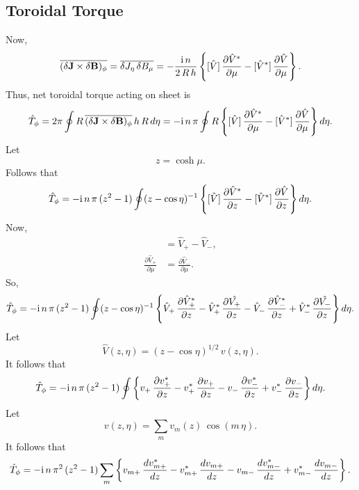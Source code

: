 \documentclass[12pt,prb,aps,notitlepage]{revtex4-1}
\begin{document}
\subsection{Toroidal Torque}
Now,
\begin{equation}
\overline{(\delta {\bf J}\times \delta{\bf B})_\phi} = \overline {\delta J_\eta\,\delta B_\mu}
=-\frac{{\rm i}\,n}{2\,R\,h}\left\{[\hat{V}]\,\frac{\partial\hat{V}^\ast}{\partial\mu} - [\hat{V}^\ast]\,\frac{\partial\hat{V}}{\partial\mu}\right\}.
\end{equation}
Thus, net toroidal torque acting on sheet is
\begin{equation}
\hat{T}_\phi = 2\pi\oint R\,\overline{(\delta {\bf J}\times \delta{\bf B})_\phi}\,h\,R\,d\eta= -{\rm i}\,n\,\pi\oint R\left\{[\hat{V}]\,\frac{\partial\hat{V}^\ast}{\partial\mu} - [\hat{V}^\ast]\,\frac{\partial\hat{V}}{\partial\mu}\right\}d\eta.
\end{equation}
Let
\begin{equation}
z = \cosh\mu.
\end{equation}
Follows that 
\begin{equation}
\hat{T}_\phi = -{\rm i}\,n\,\pi\,(z^2-1)\oint (z-\cos\eta)^{-1}\left\{[\hat{V}]\,\frac{\partial\hat{V}^\ast}{\partial z} - [\hat{V}^\ast]\,\frac{\partial\hat{V}}{\partial z}\right\}d\eta.
\end{equation}
Now,
\begin{align}
[\hat{V}] &= \hat{V}_+ - \hat{V}_-,\\[0.5ex]
\frac{\partial \hat{V}_+}{\partial\mu}&= \frac{\partial \hat{V}_-}{\partial\mu}.
\end{align}
So,
\begin{equation}
\hat{T}_\phi = -{\rm i}\,n\,\pi\,(z^2-1)\oint (z-\cos\eta)^{-1}\left\{\hat{V}_+\,\frac{\partial \hat{V}_+^\ast}{\partial z}- \hat{V}_+^\ast\,\frac{\partial\hat{V_+}}{\partial z}- \hat{V}_-\,\frac{\partial\hat{V}_-^\ast}{\partial z}+\hat{V}_-^\ast\,\frac{\partial\hat{V_-}}{\partial z}\right\}d\eta.
\end{equation}
Let
\begin{equation}
\hat{V}(z,\eta) = (z-\cos\eta)^{1/2}\,v(z,\eta).
\end{equation}
It follows that
\begin{equation}
\hat{T}_\phi = -{\rm i}\,n\,\pi\,(z^2-1)\oint\left\{v_+\,\frac{\partial v_+^\ast}{\partial z}-v_+^\ast\,\frac{\partial v_+}{\partial z}- v_-\,\frac{\partial v_-^\ast}{\partial z}+v_-^\ast\,\frac{\partial v_-}{\partial z}\right\}d\eta.
\end{equation}
Let
\begin{equation}
v(z,\eta) = \sum_m v_m(z)\,\cos(m\,\eta).
\end{equation}
It follows that
\begin{equation}
\hat{T}_\phi = -{\rm i}\,n\,\pi^2\,(z^2-1)\sum_m\left\{v_{m+}\,\frac{dv_{m+}^\ast}{dz} - v_{m+}^\ast\,\frac{dv_{m+}}{dz}
-v_{m-}\,\frac{dv_{m-}^\ast}{dz}+v_{m-}^\ast\,\frac{dv_{m-}}{dz}\right\}.
\end{equation}
\end{document}
